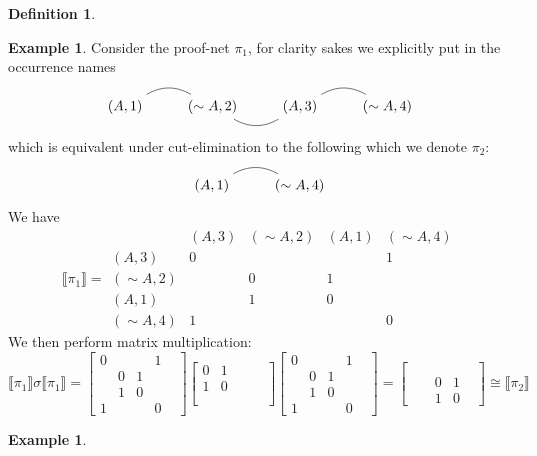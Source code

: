 \documentclass[12pt]{article}
\theoremstyle{plain}
\theoremstyle{definition}
\newtheorem{defn}[thm]{Definition} %
\newtheorem{example}[thm]{Example}
\newcommand{\negation}{\sim}
\begin{document}
\begin{defn}
\begin{example}\label{ex:axiom_GoI}
Consider the proof-net $\pi_1$, for clarity sakes we explicitly put in the occurrence names
\begin{equation}
\begin{tikzcd}
(A,1)\arrow[r,bend left, dash] & (\negation A,2)\arrow[r,bend right, dash] & (A,3)\arrow[r, bend left, dash] & (\negation A,4)
\end{tikzcd}
\end{equation}
which is equivalent under cut-elimination to the following which we denote $\pi_2$:
\begin{equation}
\begin{tikzcd}
(A,1)\arrow[r, bend left, dash] & (\negation A,4)
\end{tikzcd}
\end{equation}
We have
\begin{equation}
\llbracket \pi_1 \rrbracket = 
\begin{matrix}
& (A,3) & (\negation A,2) & (A,1) & (\negation A,4)\\
(A,3) & 0&&&1\\
(\negation A,2) &&0&1&\\
(A,1)&&1&0&\\
(\negation A,4)&1&&&0
\end{matrix}
\end{equation}
We then perform matrix multiplication:
\begin{equation}
\llbracket \pi_1 \rrbracket \sigma \llbracket \pi_1 \rrbracket = 
\begin{bmatrix}
0&&&1\\
&0&1&\\
&1&0&&\\
1&&&0
\end{bmatrix}
\begin{bmatrix}
0&1&&\\
1&0&&\\
&&&&\\
&&&&
\end{bmatrix}
\begin{bmatrix}
0&&&1\\
&0&1&\\
&1&0&&\\
1&&&0
\end{bmatrix}
=
\begin{bmatrix}
&&&&\\
&&&&\\
&&0&1\\
&&1&0
\end{bmatrix}
\cong \llbracket \pi_2\rrbracket
\end{equation}
\end{example}
\begin{example}


\end{example}
\end{defn}
\end{document}
